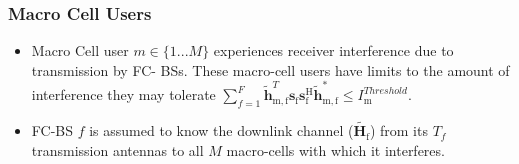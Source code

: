\documentclass[12pt]{article}
\begin{document}
\subsubsection{Macro Cell Users}

\begin{itemize}
\item 
	Macro Cell user $m \in \{1 ... M\}$ experiences receiver interference due to transmission by
	FC-	BSs. These macro-cell users have limits to the amount of interference they may tolerate 
	$\sum^F_{f=1} \mathbf{\tilde{h}}_{\mathrm{m,f}}^T  \mathbf{s}_{\mathrm{f}} 						
	\mathbf{s_{\mathrm{f}}^{\mathrm{H}}} \mathbf{\tilde{h}_{\mathrm{m,f}}^*} \leq I^{Threshold}		
	_{\mathrm{m}} $.

\item 
	FC-BS $f$ is assumed to know the downlink channel ($\tilde{\mathbf{H}_{\mathrm{f}}}$) from its $T_f$
	transmission antennas to all $M$ macro-cells with which it interferes.
\\
\end{itemize}
\end{document}
